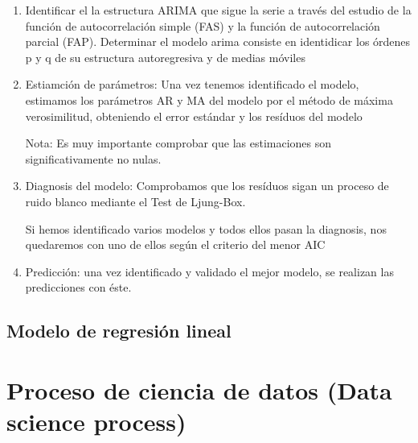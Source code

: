 \documentclass[12pt,a4paper,]{book}
\def\ifdoblecara{} %
\def\ifprincipal{} %
\numberwithin{dummy}{section}
\theoremstyle{ocrenumbox}
\theoremstyle{blacknumex}
\theoremstyle{blacknumbox}
\theoremstyle{ocrenum}
\theoremstyle{ocrenum}
\begin{document}
\begin{enumerate}
\def\labelenumi{\arabic{enumi}.}
\item
  Identificar el la estructura ARIMA que sigue la serie a través del
  estudio de la función de autocorrelación simple (FAS) y la función de
  autocorrelación parcial (FAP). Determinar el modelo arima consiste en
  identidicar los órdenes p y q de su estructura autoregresiva y de
  medias móviles
\item
  Estiamción de parámetros: Una vez tenemos identificado el modelo,
  estimamos los parámetros AR y MA del modelo por el método de máxima
  verosimilitud, obteniendo el error estándar y los resíduos del modelo

  Nota: Es muy importante comprobar que las estimaciones son
  significativamente no nulas.
\item
  Diagnosis del modelo: Comprobamos que los resíduos sigan un proceso de
  ruido blanco mediante el Test de Ljung-Box.

  Si hemos identificado varios modelos y todos ellos pasan la diagnosis,
  nos quedaremos con uno de ellos según el criterio del menor AIC
\item
  Predicción: una vez identificado y validado el mejor modelo, se
  realizan las predicciones con éste.
\end{enumerate}

\hypertarget{modelo-de-regresiuxf3n-lineal}{%
\section{Modelo de regresión
lineal}\label{modelo-de-regresiuxf3n-lineal}}

\FloatBarrier

\ifdefined\ifprincipal
\else
\setlength{\parindent}{1em}
\pagestyle{fancy}
\setcounter{tocdepth}{4}
\tableofcontents

\fi

\ifdefined\ifdoblecara
\fancyhead{}{}
\fancyhead[LE,RO]{\scriptsize\rightmark}
\fancyfoot[LO,RE]{\scriptsize\slshape \leftmark}
\fancyfoot[C]{}
\fancyfoot[LE,RO]{\footnotesize\thepage}
\else
\fancyhead{}{}
\fancyhead[RO]{\scriptsize\rightmark}
\fancyfoot[LO]{\scriptsize\slshape \leftmark}
\fancyfoot[C]{}
\fancyfoot[RO]{\footnotesize\thepage}
\fi
\renewcommand{\headrulewidth}{0.4pt}
\renewcommand{\footrulewidth}{0.4pt}

\hypertarget{proceso-de-ciencia-de-datos-data-science-process}{%
\chapter{Proceso de ciencia de datos (Data science
process)}\label{proceso-de-ciencia-de-datos-data-science-process}}
\end{document}
